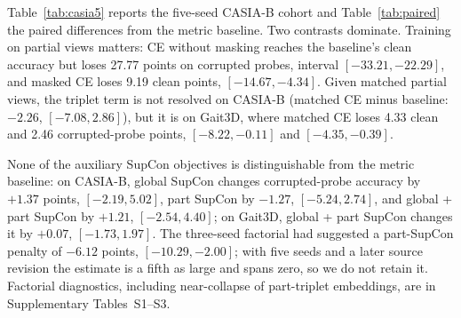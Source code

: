 \documentclass[review,12pt]{elsarticle}
\begin{document}
Table~\ref{tab:casia5} reports the five-seed CASIA-B cohort and
Table~\ref{tab:paired} the paired differences from the metric baseline. Two
contrasts dominate. Training on partial views matters: CE without masking
reaches the baseline's clean accuracy but loses 27.77 points on corrupted
probes, interval $[-33.21,-22.29]$, and masked CE loses 9.19 clean points,
$[-14.67,-4.34]$. Given matched partial views, the triplet term is not
resolved on CASIA-B (matched CE minus baseline: $-2.26$, $[-7.08,2.86]$), but it
is on Gait3D, where matched CE loses 4.33 clean and 2.46 corrupted-probe points,
$[-8.22,-0.11]$ and $[-4.35,-0.39]$.

None of the auxiliary SupCon objectives is distinguishable from the metric
baseline: on CASIA-B, global SupCon changes corrupted-probe accuracy by $+1.37$
points, $[-2.19,5.02]$, part SupCon by $-1.27$, $[-5.24,2.74]$, and global + part
SupCon by $+1.21$, $[-2.54,4.40]$; on Gait3D, global + part SupCon changes it by
$+0.07$, $[-1.73,1.97]$. The three-seed factorial had suggested a part-SupCon
penalty of $-6.12$ points, $[-10.29,-2.00]$; with five seeds and a later source
revision the estimate is a fifth as large and spans zero, so we do not retain it.
Factorial diagnostics, including near-collapse of part-triplet embeddings, are
in Supplementary Tables~S1--S3.
\end{document}
